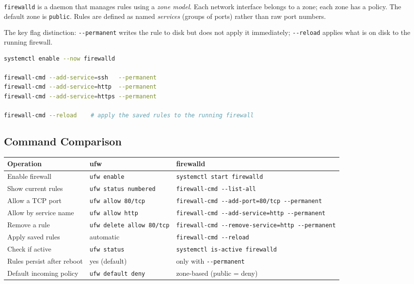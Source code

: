 \documentclass[11pt,a4paper]{article}
\begin{document}
\texttt{firewalld} is a daemon that manages rules using a \emph{zone model}. Each network interface belongs to a zone; each zone has a policy. The default zone is \texttt{public}. Rules are defined as named \emph{services} (groups of ports) rather than raw port numbers.

The key flag distinction: \texttt{-{}-permanent} writes the rule to disk but does not apply it immediately; \texttt{-{}-reload} applies what is on disk to the running firewall.

\begin{lstlisting}[language=bash, caption={setup\_firewall.sh -- Fedora}]
systemctl enable --now firewalld

firewall-cmd --add-service=ssh   --permanent
firewall-cmd --add-service=http  --permanent
firewall-cmd --add-service=https --permanent

firewall-cmd --reload    # apply the saved rules to the running firewall
\end{lstlisting}

\subsection{Command Comparison}

\begin{center}
\begin{tabular}{L{4.5cm}L{4.5cm}L{4.5cm}}
\toprule
\textbf{Operation} & \textbf{ufw} & \textbf{firewalld} \\
\midrule
Enable firewall         & \texttt{ufw enable}             & \texttt{systemctl start firewalld} \\
Show current rules      & \texttt{ufw status numbered}    & \texttt{firewall-cmd -{}-list-all} \\
Allow a TCP port        & \texttt{ufw allow 80/tcp}       & \texttt{firewall-cmd -{}-add-port=80/tcp -{}-permanent} \\
Allow by service name   & \texttt{ufw allow http}         & \texttt{firewall-cmd -{}-add-service=http -{}-permanent} \\
Remove a rule           & \texttt{ufw delete allow 80/tcp}& \texttt{firewall-cmd -{}-remove-service=http -{}-permanent} \\
Apply saved rules       & automatic                       & \texttt{firewall-cmd -{}-reload} \\
Check if active         & \texttt{ufw status}             & \texttt{systemctl is-active firewalld} \\
Rules persist after reboot & yes (default)               & only with \texttt{-{}-permanent} \\
Default incoming policy & \texttt{ufw default deny}       & zone-based (public = deny) \\
\bottomrule
\end{tabular}
\end{center}
\end{document}
